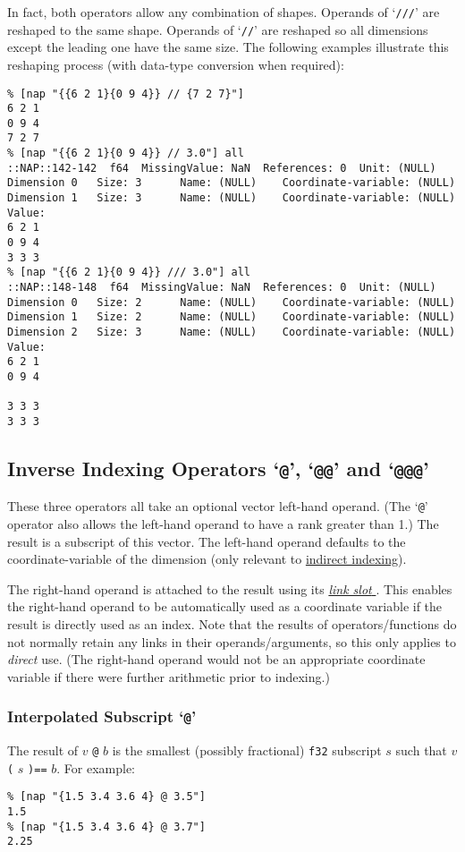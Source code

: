   \par In fact, both operators allow any combination of shapes. Operands
  of `\texttt{///}' are reshaped to the same shape. Operands of
  `\texttt{//}' are reshaped so all dimensions except the
  leading one have the same size. The following examples illustrate
  this reshaping process (with data-type conversion when required):
  \begin{verbatim}
% [nap "{{6 2 1}{0 9 4}} // {7 2 7}"]
6 2 1
0 9 4
7 2 7
% [nap "{{6 2 1}{0 9 4}} // 3.0"] all
::NAP::142-142  f64  MissingValue: NaN  References: 0  Unit: (NULL)
Dimension 0   Size: 3      Name: (NULL)    Coordinate-variable: (NULL)
Dimension 1   Size: 3      Name: (NULL)    Coordinate-variable: (NULL)
Value:
6 2 1
0 9 4
3 3 3
% [nap "{{6 2 1}{0 9 4}} /// 3.0"] all
::NAP::148-148  f64  MissingValue: NaN  References: 0  Unit: (NULL)
Dimension 0   Size: 2      Name: (NULL)    Coordinate-variable: (NULL)
Dimension 1   Size: 2      Name: (NULL)    Coordinate-variable: (NULL)
Dimension 2   Size: 3      Name: (NULL)    Coordinate-variable: (NULL)
Value:
6 2 1
0 9 4

3 3 3
3 3 3
\end{verbatim}

  \subsection{
    \label{Inverse:Indexing}Inverse Indexing Operators `\texttt{@}', `\texttt{@@}' and `\texttt{@@@}'
  }

  \par These three operators all take an optional vector left-hand
  operand. (The `\texttt{@}' operator also allows the left-hand operand to
  have a rank greater than 1.) The result is a subscript of this
  vector. The left-hand operand defaults to the coordinate-variable of
  the dimension (only relevant to 
  \href{indexing.html\#indirect:indexing}{indirect indexing}).
  \par The right-hand operand is attached to the result using its 
  \href{nao.html}{ \textit{link slot} }. This enables the right-hand operand to be automatically used as
  a coordinate variable if the result is directly used as an index.
  Note that the results of operators/functions do not normally retain
  any links in their operands/arguments, so this only applies to 
  \textit{direct} use. (The right-hand operand would not be an
  appropriate coordinate variable if there were further arithmetic
  prior to indexing.)
  \subsubsection{
    \label{Interpolated:Subscript}Interpolated Subscript `\texttt{@}'
  }
The result of 
  $v$
  \texttt{@}
  $b$ is the smallest (possibly fractional) 
  \texttt{f32} subscript 
  $s$ such that 
  $v$
  \texttt{(}
  $s$
  \texttt{)==}
  $b$. For example:
  \begin{verbatim}
% [nap "{1.5 3.4 3.6 4} @ 3.5"]
1.5
% [nap "{1.5 3.4 3.6 4} @ 3.7"]
2.25
\end{verbatim}

